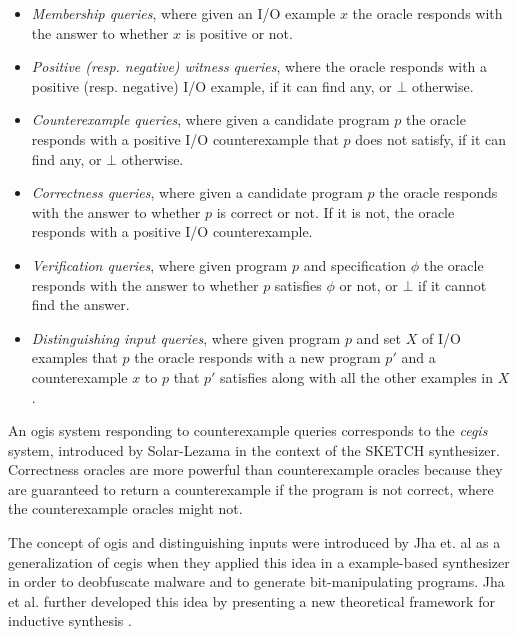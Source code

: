 \begin{itemize}
\item \textit{Membership queries}, where given an I/O example $x$ the oracle
  responds with the answer to whether $x$ is positive or not.
\item \textit{Positive (resp. negative) witness queries}, where the oracle
  responds with a positive (resp. negative) I/O example, if it can find any, or
  $\bot$ otherwise.
\item \textit{Counterexample queries}, where given a candidate program $p$ the
  oracle responds with a positive I/O counterexample that $p$ does not satisfy,
  if it can find any, or $\bot$ otherwise.
\item \textit{Correctness queries}, where given a candidate program $p$ the
  oracle responds with the answer to whether $p$ is correct or not. If it is not,
  the oracle responds with a positive I/O counterexample.
\item \textit{Verification queries}, where given program $p$ and specification
  $\phi$ the oracle responds with the answer to whether $p$ satisfies $\phi$ or
  not, or $\bot$ if it cannot find the answer.
\item \textit{Distinguishing input queries}, where given program $p$ and set $X$
  of I/O examples that $p$  the oracle responds with a new program $p'$ and a
  counterexample $x$ to $p$ that $p'$ satisfies along with all the other
  examples in $X$.
\end{itemize}

An \gls{ogis} system responding to counterexample queries corresponds to the
\textit{\gls{cegis}} system, introduced by Solar-Lezama \cite{Solar-Lezama:2008}
in the context of the SKETCH synthesizer. Correctness oracles are more powerful
than counterexample oracles because they are guaranteed to return a
counterexample if the program is not correct, where the counterexample oracles
might not.

The concept of \gls{ogis} and distinguishing inputs were introduced by Jha et.
al \cite{Jha:2017:TFS} as a generalization of \gls{cegis} when they applied
this idea in a example-based synthesizer in order to deobfuscate malware and to
generate bit-manipulating programs. Jha et al. further developed this idea by
presenting a new theoretical framework for inductive synthesis
\cite{Jha:2017:TFS}.


